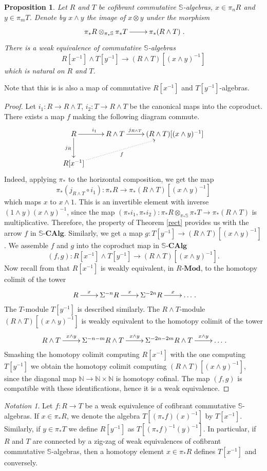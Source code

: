\documentclass[a4paper,11pt]{amsart} %
\theoremstyle{definition} \newtheorem{defn}[equation]{Definition}
\theoremstyle{remark} \newtheorem{notation}[equation]{Notation}
\theoremstyle{plain} \newtheorem{teo}[equation]{Theorem}
\theoremstyle{plain} \newtheorem{lema}[equation]{Lemma}
\theoremstyle{plain} \newtheorem{prop}[equation]{Proposition}
\theoremstyle{plain} \newtheorem{corolario}[equation]{Corollary}
\theoremstyle{remark} \newtheorem{obs}[equation]{Remark}
\theoremstyle{remark} \newtheorem{sideobs}[equation]{Side remark}
\theoremstyle{remark} \newtheorem{ejercicio}[equation]{Exercise}
\theoremstyle{definition} \newtheorem{notn}[equation]{Notation}
\theoremstyle{remark} \newtheorem{ej}[equation]{Example}
\theoremstyle{remark} \newtheorem{contraej}[equation]{Counterexample}
\theoremstyle{plain} \newtheorem{conj}[equation]{Conjecture}
\renewcommand{\1}{\ensuremath{\mathbbm{1}}}
\renewcommand{\S}{\mathbb{S}}
\newcommand{\N}{\mathbb{N}}
\newcommand{\bprop}{\begin{prop}}
\newcommand{\eprop}{\end{prop}}
\newcommand{\bprf}{\begin{proof}}
\newcommand{\eprf}{\end{proof}}
\newcommand{\RMod}{\ensuremath{R}\mbox{-}\mathbf{Mod}}
\newcommand{\SCAlg}{\ensuremath{\mathbb{S}}\mbox{-}\ensuremath{\mathbf{CAlg}}}
\numberwithin{equation}{section}
\begin{document}
\bprop \label{sepa} Let $R$ and $T$ be cofibrant commutative $\S$-algebras, $x\in \pi_nR$ and $y\in \pi_mT$. Denote by $x\wedge y$ the image of $x\otimes y$ under the morphism %
\[\xymatrix{\pi_*R \otimes_{\pi_*\S} \pi_*T \ar[r] & \pi_*(R\wedge T)}.\]
There is a weak equivalence of commutative $\S$-algebras 
 \[R[x^{-1}]\wedge T[y^{-1}] \to (R\wedge T)[(x\wedge y)^{-1}]\]
which is natural on $R$ and $T$.
%
\eprop %
%
Note that this is is also a map of commutative $R[x^{-1}]$ and $T[y^{-1}]$-algebras.
\bprf Let $i_1:R\to R\wedge T$, $i_2:T\to R\wedge T$ be the canonical maps into the coproduct. There exists a map $f$ making the following diagram commute.
%
\[\xymatrix{R \ar[d]_-{j_R} \ar[r]^{i_1} & R\wedge T \ar[r]^-{j_{R\wedge T}} & (R\wedge T)[(x\wedge y)^{-1}] \\ R[x^{-1}] \ar@{.>}[rru]_-f}\]
Indeed, applying $\pi_*$ to the horizontal composition, we get the map \[\pi_*(j_{R\wedge T}\circ i_1): \pi_*R \to \pi_*(R\wedge T)[(x\wedge y)^{-1}]\]which maps $x$ to $x\wedge 1$. This is an invertible element with inverse $(1\wedge y)(x\wedge y)^{-1}$, since the map $(\pi_*i_1,\pi_*i_2): \pi_*R \otimes_{\pi_*\S} \pi_* T \to \pi_*(R\wedge T)$ %
is multiplicative. Therefore, the property of Theorem \ref{rect} provides us with the arrow $f$ in $\SCAlg$. Similarly, we get a map $g:T[y^{-1}] \to (R\wedge T)[(x\wedge y)^{-1}]$. We assemble $f$ and $g$ into the coproduct map in $\SCAlg$
\[(f,g):R[x^{-1}]\wedge T[y^{-1}] \to (R\wedge T)[(x\wedge y)^{-1}].\]
Now recall from \cite[Section V.1]{ekmm} that $R[x^{-1}]$ is weakly equivalent, in $\RMod$, to the homotopy colimit of the tower
\begin{equation}\label{telescope}\xymatrix{R\ar[r]^-x & \Sigma^{-n} R \ar[r]^-x & \Sigma^{-2n} R\ar[r]^-x & \dots}.\end{equation}
The $T$-module $T[y^{-1}]$ is described similarly. The $R\wedge T$-module $(R\wedge T)[(x\wedge y)^{-1}]$ is weakly equivalent to the homotopy colimit of the tower
\[\xymatrix{R \wedge T\ar[r]^-{x\wedge y} & \Sigma^{-n-m} R\wedge T \ar[r]^-{x\wedge y} & \Sigma^{-2n-2m} R\wedge T\ar[r]^-{x\wedge y} & \dots}.\]
Smashing the homotopy colimit computing $R[x^{-1}]$ with the one computing $T[y^{-1}]$ we obtain the homotopy colimit computing $(R\wedge T)[(x\wedge y)^{-1}]$, since the diagonal map $\N\to \N\times \N$ is homotopy cofinal. The map $(f,g)$ is compatible with these identifications, hence it is a weak equivalence. %
\eprf

\begin{notation} Let $f:R\to T$ be a weak equivalence of cofibrant commutative $\S$-algebras. If $x\in \pi_*R$, we denote the algebra $T[(\pi_*f)(x)^{-1}]$ by $T[x^{-1}]$. Similarly, if $y\in \pi_*T$ we define $R[y^{-1}]$ as $T[(\pi_*f)^{-1}(y)^{-1}]$. In particular, if $R$ and $T$ are connected by a zig-zag of weak equivalences of cofibrant commutative $\S$-algebras, then a homotopy element $x\in \pi_*R$ defines $T[x^{-1}]$ and conversely. 
\end{notation}
\end{document}
